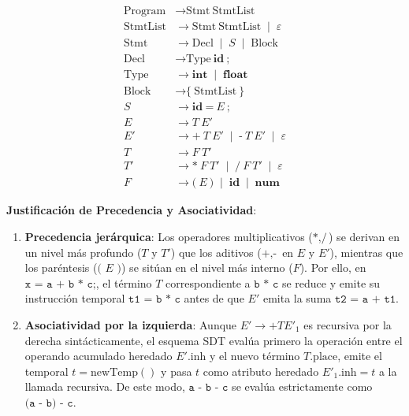 \documentclass[11pt, letterpaper]{article}
\begin{document}
\begin{align*}
    \text{Program} &\rightarrow \text{Stmt}\ \text{StmtList} \\
    \text{StmtList} &\rightarrow \text{Stmt}\ \text{StmtList} \;\mid\; \varepsilon \\
    \text{Stmt} &\rightarrow \text{Decl} \;\mid\; S \;\mid\; \text{Block} \\
    \text{Decl} &\rightarrow \text{Type}\ \textbf{id}\ \textbf{;} \\
    \text{Type} &\rightarrow \textbf{int} \;\mid\; \textbf{float} \\
    \text{Block} &\rightarrow \textbf{\{}\ \text{StmtList}\ \textbf{\}} \\[0.2cm]
    S &\rightarrow \textbf{id}\ \textbf{=}\ E\ \textbf{;} \\
    E &\rightarrow T\ E' \\
    E' &\rightarrow \textbf{+}\ T\ E' \;\mid\; \textbf{-}\ T\ E' \;\mid\; \varepsilon \\
    T &\rightarrow F\ T' \\
    T' &\rightarrow \textbf{*}\ F\ T' \;\mid\; \textbf{/}\ F\ T' \;\mid\; \varepsilon \\
    F &\rightarrow \textbf{(}\ E\ \textbf{)} \;\mid\; \textbf{id} \;\mid\; \textbf{num}
\end{align*}

\textbf{Justificación de Precedencia y Asociatividad}:
\begin{enumerate}[leftmargin=1.8em]
    \item \textbf{Precedencia jerárquica}: Los operadores multiplicativos ($\texttt{*}, \texttt{/}$) se derivan en un nivel más profundo ($T$ y $T'$) que los aditivos ($\texttt{+}, \texttt{-}$ en $E$ y $E'$), mientras que los paréntesis ($\texttt{( } E \texttt{ )}$) se sitúan en el nivel más interno ($F$). Por ello, en $\texttt{x = a + b * c;}$, el término $T$ correspondiente a $\texttt{b * c}$ se reduce y emite su instrucción temporal $\texttt{t1 = b * c}$ antes de que $E'$ emita la suma $\texttt{t2 = a + t1}$.
    \item \textbf{Asociatividad por la izquierda}: Aunque $E' \rightarrow \texttt{+} T E'_1$ es recursiva por la derecha sintácticamente, el esquema SDT evalúa primero la operación entre el operando acumulado heredado $E'.\text{inh}$ y el nuevo término $T.\text{place}$, emite el temporal $t = \text{newTemp}()$ y pasa $t$ como atributo heredado $E'_1.\text{inh} = t$ a la llamada recursiva. De este modo, $\texttt{a - b - c}$ se evalúa estrictamente como $\texttt{(a - b) - c}$.
\end{enumerate}
\end{document}
